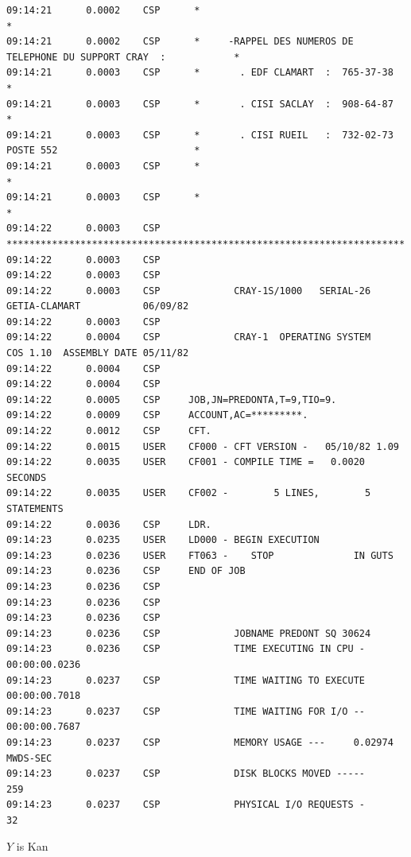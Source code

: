 {\begin{verbatim}
09:14:21      0.0002    CSP      *                                                                    *
09:14:21      0.0002    CSP      *     -RAPPEL DES NUMEROS DE TELEPHONE DU SUPPORT CRAY  :            *
09:14:21      0.0003    CSP      *       . EDF CLAMART  :  765-37-38                                  *
09:14:21      0.0003    CSP      *       . CISI SACLAY  :  908-64-87                                  *
09:14:21      0.0003    CSP      *       . CISI RUEIL   :  732-02-73 POSTE 552                        *
09:14:21      0.0003    CSP      *                                                                    *
09:14:21      0.0003    CSP      *                                                                    *
09:14:22      0.0003    CSP      **********************************************************************
09:14:22      0.0003    CSP
09:14:22      0.0003    CSP
09:14:22      0.0003    CSP             CRAY-1S/1000   SERIAL-26        GETIA-CLAMART           06/09/82
09:14:22      0.0003    CSP
09:14:22      0.0004    CSP             CRAY-1  OPERATING SYSTEM        COS 1.10  ASSEMBLY DATE 05/11/82
09:14:22      0.0004    CSP
09:14:22      0.0004    CSP
09:14:22      0.0005    CSP     JOB,JN=PREDONTA,T=9,TIO=9.
09:14:22      0.0009    CSP     ACCOUNT,AC=*********.
09:14:22      0.0012    CSP     CFT.
09:14:22      0.0015    USER    CF000 - CFT VERSION -   05/10/82 1.09
09:14:22      0.0035    USER    CF001 - COMPILE TIME =   0.0020 SECONDS
09:14:22      0.0035    USER    CF002 -        5 LINES,        5 STATEMENTS
09:14:22      0.0036    CSP     LDR.
09:14:23      0.0235    USER    LD000 - BEGIN EXECUTION
09:14:23      0.0236    USER    FT063 -    STOP              IN GUTS
09:14:23      0.0236    CSP     END OF JOB
09:14:23      0.0236    CSP
09:14:23      0.0236    CSP
09:14:23      0.0236    CSP
09:14:23      0.0236    CSP             JOBNAME PREDONT SQ 30624
09:14:23      0.0236    CSP             TIME EXECUTING IN CPU - 00:00:00.0236
09:14:23      0.0237    CSP             TIME WAITING TO EXECUTE 00:00:00.7018
09:14:23      0.0237    CSP             TIME WAITING FOR I/O -- 00:00:00.7687
09:14:23      0.0237    CSP             MEMORY USAGE ---     0.02974 MWDS-SEC
09:14:23      0.0237    CSP             DISK BLOCKS MOVED -----      259
09:14:23      0.0237    CSP             PHYSICAL I/O REQUESTS -       32
\end{verbatim}
}

$Y$ is Kan


